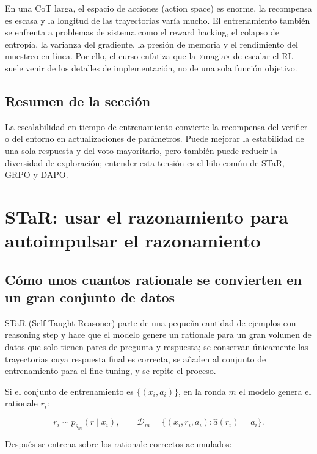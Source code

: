 \documentclass[a4paper]{article}
\begin{document}
En una CoT larga, el espacio de acciones (action space) es enorme, la recompensa es escasa y la longitud de las trayectorias varía mucho. El entrenamiento también se enfrenta a problemas de sistema como el reward hacking, el colapso de entropía, la varianza del gradiente, la presión de memoria y el rendimiento del muestreo en línea. Por ello, el curso enfatiza que la «magia» de escalar el RL suele venir de los detalles de implementación, no de una sola función objetivo.

\subsection{Resumen de la sección}

La escalabilidad en tiempo de entrenamiento convierte la recompensa del verifier o del entorno en actualizaciones de parámetros. Puede mejorar la estabilidad de una sola respuesta y del voto mayoritario, pero también puede reducir la diversidad de exploración; entender esta tensión es el hilo común de STaR, GRPO y DAPO.
\section{STaR: usar el razonamiento para autoimpulsar el razonamiento}

\subsection{Cómo unos cuantos rationale se convierten en un gran conjunto de datos}

STaR (Self-Taught Reasoner) parte de una pequeña cantidad de ejemplos con reasoning step y hace que el modelo genere un rationale para un gran volumen de datos que solo tienen pares de pregunta y respuesta; se conservan únicamente las trayectorias cuya respuesta final es correcta, se añaden al conjunto de entrenamiento para el fine-tuning, y se repite el proceso.


Si el conjunto de entrenamiento es $\{(x_i,a_i)\}$, en la ronda $m$ el modelo genera el rationale $r_i$:

$$
r_i\sim p_{\theta_m}(r\mid x_i),\qquad
\mathcal D_m=\{(x_i,r_i,a_i):\hat a(r_i)=a_i\}.
$$

Después se entrena sobre los rationale correctos acumulados:
\end{document}
